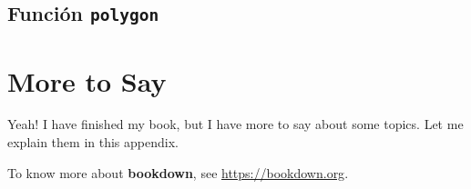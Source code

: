 \documentclass[10pt,]{krantz}
\begin{document}
\section{\texorpdfstring{Función \texttt{polygon} 
}{Función polygon  }}\label{funcion-polygon}

\cleardoublepage 

\appendix {}


\chapter{More to Say}\label{more-to-say}

Yeah! I have finished my book, but I have more to say about some topics.
Let me explain them in this appendix.

To know more about \textbf{bookdown}, see \url{https://bookdown.org}.



\backmatter
\printindex
\end{document}
